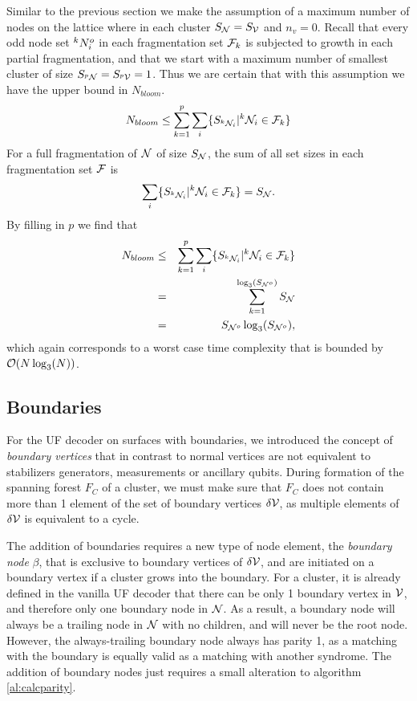 Similar to the previous section we make the assumption of a maximum number of nodes on the lattice where in each cluster $S_{\mathcal{N}} = S_{\mathcal{V}}$ and $n_v = 0$. Recall that every odd node set ${}^{k}N^o_i$ in each fragmentation set $\mathcal{F}_k$ is subjected to growth in each partial fragmentation, and that we start with a maximum number of smallest cluster of size $S_{{}^{p}\mathcal{N}} = S_{{}^{p}\mathcal{V}} = 1$. Thus we are certain that with this assumption we have the upper bound in $N_{bloom}$.
\begin{equation}\label{eq:nnode}
  N_{bloom} \leq \sum^{p}_{k=1}\sum_i \{ S_{{}^{k}\mathcal{N}_i} | {}^{k}\mathcal{N}_i \in \mathcal{F}_k \}
\end{equation}
For a full fragmentation of $\mathcal{N}$ of size $S_{\mathcal{N}}$, the sum of all set sizes in each fragmentation set $\mathcal{F}$ is
\begin{equation}\label{eq:sumsetsfrag}
  \sum_i \{S_{{}^{k}\mathcal{N}_i} | {}^{k}\mathcal{N}_i \in \mathcal{F}_k \} = S_{\mathcal{N}}.
\end{equation}
By filling in $p$ we find that
\begin{eqnarray}
  \nonumber N_{bloom} &\leq& \sum^{p}_{k=1}\sum_i \{ S_{{}^{k}\mathcal{N}_i} | {}^{k}\mathcal{N}_i \in \mathcal{F}_k \} \\
  \nonumber &=& \sum_{k=1}^{\log_3(S_{\mathcal{N}^o})} S_{\mathcal{N}} \\
   &=& S_{\mathcal{N}^o}\log_3(S_{\mathcal{N}^o}),
\end{eqnarray}
which again corresponds to a worst case time complexity that is bounded by $\mathcal{O}(N\log_3(N))$.

\subsection{Boundaries}

For the UF decoder on surfaces with boundaries, we introduced the concept of \emph{boundary vertices} that in contrast to normal vertices are not equivalent to stabilizers generators, measurements or ancillary qubits. During formation of the spanning forest $F_C$ of a cluster, we must make sure that $F_C$ does not contain more than 1 element of the set of boundary vertices $\delta\mathcal{V}$, as multiple elements of $\delta\mathcal{V}$ is equivalent to a cycle.

The addition of boundaries requires a new type of node element, the \emph{boundary node} $\beta$, that is exclusive to boundary vertices of $\delta\mathcal{V}$, and are initiated on a boundary vertex if a cluster grows into the boundary. For a cluster, it is already defined in the vanilla UF decoder that there can be only 1 boundary vertex in $\mathcal{V}$, and therefore only one boundary node in $\mathcal{N}$. As a result, a boundary node will always be a trailing node in $\mathcal{N}$ with no children, and will never be the root node. However, the always-trailing boundary node  always has parity 1, as a matching with the boundary is equally valid as a matching with another syndrome. The addition of boundary nodes just requires a small alteration to algorithm \ref{al:calcparity}.

